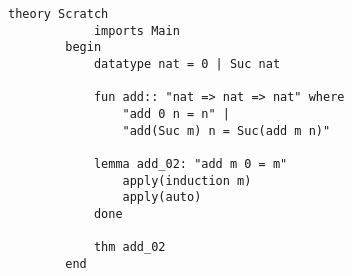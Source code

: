 \begin{lstlisting}[captionpos=b, caption={[Isabelle example] Here the following lemma add\char`_02 is validated: Adding zero to a natural number is equal to this number.
    This is carried out by defining a recursive function in Line 6 - 8. The lemma "add\char`_02" which refers to this function is defined in line 10. The command "apply" instigates Isabelle to start a proof by induction on m. This can be seen in Line 11. In the next line, the command "apply(induction m)" instructs Isabelle to proove all subgoals automatically. }, label={isabelleexample}]
        theory Scratch
            imports Main
        begin
            datatype nat = 0 | Suc nat

            fun add:: "nat => nat => nat" where
                "add 0 n = n" |
                "add(Suc m) n = Suc(add m n)"

            lemma add_02: "add m 0 = m"
                apply(induction m)
                apply(auto)
            done

            thm add_02
        end

    \end{lstlisting}